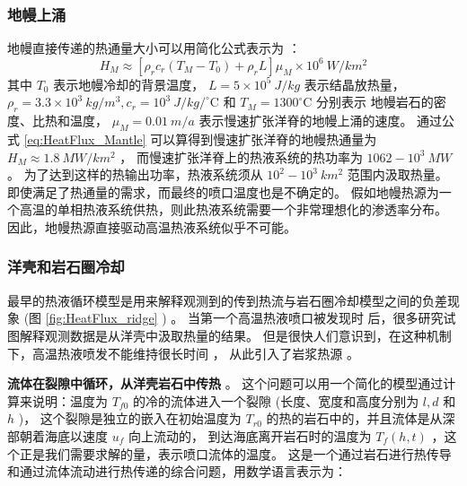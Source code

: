 \subsubsection{地幔上涌} 
地幔直接传递的热通量大小可以用简化公式表示为 \citep{lowell2010hydrothermal} ：
\begin{equation} 
	H_M \approx [\rho_r c_r (T_M - T_0) + \rho_r L]\mu_M \times 10^6 \ W/km^2
	\label{eq:HeatFlux_Mantle} 
\end{equation} 
其中 $ T_0 $ 表示地幔冷却的背景温度， $ L = 5 \times 10^5\ J/kg $ 表示结晶放热量，
 $ \rho_r = 3.3\times 10^3 \ kg/m^3, c_r = 10^3 \ J/kg/^{\circ} \text{C}  $ 和 $ T_M = 1300^{\circ} \text{C}  $ 分别表示
地幔岩石的密度、比热和温度， $ \mu_M = 0.01\ m/a $ 表示慢速扩张洋脊的地幔上涌的速度。
通过公式 \ref{eq:HeatFlux_Mantle} 可以算得到慢速扩张洋脊的地幔热通量为  $ H_M \approx 1.8 \ MW/km^2 $ ，
而慢速扩张洋脊上的热液系统的热功率为  $ 1062 - 10^3 \ MW $   \citep{lowell2010hydrothermal} 。
为了达到这样的热输出功率，热液系统须从 $ 10^2 - 10^3 \ km^2 $ 范围内汲取热量。
即使满足了热通量的需求，而最终的喷口温度也是不确定的。
假如地幔热源为一个高温的单相热液系统供热，则此热液系统需要一个非常理想化的渗透率分布。
因此，地幔热源直接驱动高温热液系统似乎不可能。

\subsubsection{洋壳和岩石圈冷却} 
最早的热液循环模型是用来解释观测到的传到热流与岩石圈冷却模型之间的负差现象 (图 \ref{fig:HeatFlux_ridge} ) 。
当第一个高温热液喷口被发现时 \citep{spiess1980east} 后，很多研究试图解释观测数据是从洋壳中汲取热量的结果。
但是很快人们意识到，在这种机制下，高温热液喷发不能维持很长时间 \citep{strens1982model,lowell1985hydrothermal} ，
从此引入了岩浆热源 \citep{cann1982black,lowell1985hydrothermal,lowell1991numerical} 。

\textbf{流体在裂隙中循环，从洋壳岩石中传热}   \citep{bodvarsson1972ocean,lowell1975circulation,strens1982model} 。
这个问题可以用一个简化的模型通过计算来说明：温度为  $ T_{f0}  $  的冷的流体进入一个裂隙 (长度、宽度和高度分别为  $ l,d $ 和  $ h $ )，
这个裂隙是独立的嵌入在初始温度为  $ T_{r0}  $ 的热的岩石中的，并且流体是从深部朝着海底以速度  $ u_f $ 向上流动的，
到达海底离开岩石时的温度为  $ T_f(h,t) $ ，这个正是我们需要求解的量，表示喷口流体的温度。
这是一个通过岩石进行热传导和通过流体流动进行热传递的综合问题，用数学语言表示为：

